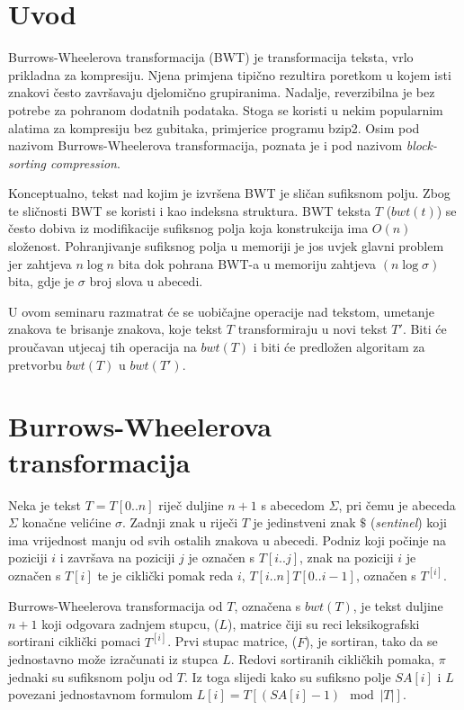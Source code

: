 \documentclass{ferseminar}
\begin{document}
\stvoripredstranice
\section{Uvod}

Burrows-Wheelerova transformacija (BWT) je transformacija teksta, vrlo prikladna za kompresiju. Njena primjena tipično rezultira poretkom u kojem isti znakovi često završavaju djelomično grupiranima. Nadalje, reverzibilna je bez potrebe za pohranom dodatnih podataka. Stoga se koristi u nekim popularnim alatima za kompresiju bez gubitaka, primjerice programu bzip2.  Osim pod nazivom Burrows-Wheelerova transformacija, poznata je i pod nazivom \textit{block-sorting compression}. 

Konceptualno, tekst nad kojim je izvršena BWT je sličan sufiksnom polju. Zbog te sličnosti BWT se koristi i kao indeksna struktura. BWT teksta $T$ ($bwt(t)$) se često dobiva iz modifikacije sufiksnog polja koja konstrukcija ima $O(n)$ složenost. Pohranjivanje sufiksnog polja u memoriji je jos uvjek glavni problem jer zahtjeva $n\log{}n$ bita dok pohrana BWT-a u memoriju zahtjeva $(n\log{}\sigma)$ bita, gdje je $\sigma$ broj slova u abecedi.

U ovom seminaru razmatrat će se uobičajne operacije nad tekstom, umetanje znakova te brisanje znakova, koje tekst $T$ transformiraju u novi tekst $T'$. Biti će proučavan utjecaj tih operacija na $bwt(T)$ i biti će predložen algoritam za pretvorbu $bwt(T)$ u $bwt(T')$.
\section{Burrows-Wheelerova transformacija}
Neka je tekst $T=T[0..n]$ riječ duljine $n+1$ s abecedom $\Sigma$, pri čemu je abeceda $\Sigma$ konačne velićine $\sigma$. Zadnji znak u riječi $T$ je jedinstveni znak $\$$ (\textit{sentinel}) koji ima vrijednost manju od svih ostalih znakova u abecedi.  Podniz koji počinje na poziciji $i$ i završava na poziciji $j$ je označen s $T[i..j]$, znak na poziciji $i$ je označen s $T[i]$ te je ciklički pomak reda $i$,  $T[i..n]T[0..i-1]$, označen s $T^{[i]}$.

Burrows-Wheelerova transformacija od $T$, označena s $bwt(T)$, je tekst duljine $n+1$ koji odgovara zadnjem stupcu, ($L$), matrice čiji su reci leksikografski sortirani ciklički pomaci $T^{[i]}$. Prvi stupac matrice, ($F$), je sortiran, tako da se jednostavno može izračunati iz stupca $L$. Redovi sortiranih cikličkih pomaka, $\pi$ jednaki su sufiksnom polju od $T$. Iz toga slijedi kako su sufiksno polje $SA[i]$ i $L$ povezani jednostavnom formulom $L[i]= T[(SA[i]-1) \mod |T|]$.
\end{document}
